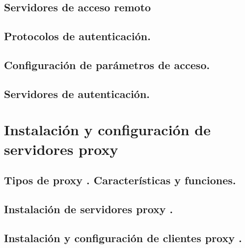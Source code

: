 \documentclass[letterpaper,10pt,spanish]{sphinxmanual}
\begin{document}
\section{Servidores de acceso remoto}
\label{\detokenize{tema_acceso_remoto/tema_acceso_remoto:servidores-de-acceso-remoto}}

\section{Protocolos de autenticación.}
\label{\detokenize{tema_acceso_remoto/tema_acceso_remoto:protocolos-de-autenticacion}}

\section{Configuración de parámetros de acceso.}
\label{\detokenize{tema_acceso_remoto/tema_acceso_remoto:configuracion-de-parametros-de-acceso}}

\section{Servidores de autenticación.}
\label{\detokenize{tema_acceso_remoto/tema_acceso_remoto:servidores-de-autenticacion}}

\chapter{Instalación y configuración de servidores  proxy}
\label{\detokenize{tema_proxys/tema_proxys:instalacion-y-configuracion-de-servidores-proxy}}\label{\detokenize{tema_proxys/tema_proxys::doc}}

\section{Tipos de  proxy . Características y funciones.}
\label{\detokenize{tema_proxys/tema_proxys:tipos-de-proxy-caracteristicas-y-funciones}}

\section{Instalación de servidores  proxy .}
\label{\detokenize{tema_proxys/tema_proxys:instalacion-de-servidores-proxy}}

\section{Instalación y configuración de clientes  proxy .}
\label{\detokenize{tema_proxys/tema_proxys:instalacion-y-configuracion-de-clientes-proxy}}
\end{document}
